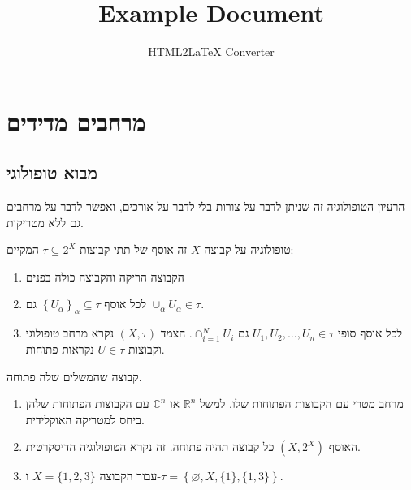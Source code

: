 \documentclass{tstextbook}
\begin{document}
\title{Example Document}
\author{HTML2LaTeX Converter}
\maketitle

\chapter{מרחבים מדידים}

\section{מבוא טופולוגי}

הרעיון הטופולוגיה זה שניתן לדבר על צורות בלי לדבר על אורכים, ואפשר לדבר על מרחבים גם ללא מטריקות.

\begin{definition}[טופולוגיה]
טופולוגיה על קבוצה \(X\) זה אוסף של תתי קבוצות \(\tau \subseteq 2^{X}\) המקיים:

  \begin{enumerate}
    \item הקבוצה הריקה והקבוצה כולה בפנים 


    \item לכל אוסף \(\left\{  U_{\alpha}  \right\}_{\alpha}\subseteq \tau\) גם \(\cup_{\alpha}U_{\alpha}\in \tau\). 


    \item לכל אוסף סופי \(U_{1},U_{2},\dots,U_{n}\in \tau\) גם \(\cap_{i=1}^{N}U_{i}\). 
הצמד \(\left( X,\tau \right)\) נקרא מרחב טופולוגי וקבוצות \(U \in \tau\) נקראות פתוחות.


  \end{enumerate}
\end{definition}
\begin{definition}
קבוצה שהמשלים שלה פתוחה.

\end{definition}
\begin{example}
  \begin{enumerate}
    \item מרחב מטרי עם הקבוצות הפתוחות שלו. למשל \(\mathbb{R}^{n}\) או \(\mathbb{C}^{n}\) עם הקבוצות הפתוחות שלהן ביחס למטריקה האוקלידית. 


    \item האוסף \((X,2^{X})\) כל קבוצה תהיה פתוחה. זה נקרא הטופולוגיה הדיסקרטית. 


    \item עבור הקבוצה \(X=\{ 1,2,3 \}\) ו-\(\tau=\left\{  \varnothing,X,\{ 1 \},\{ 1,3 \}  \right\}\). 


  \end{enumerate}
\end{example}
\end{document}
